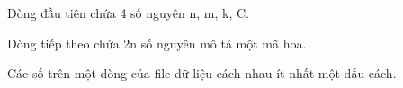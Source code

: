 Dòng đầu tiên chứa 4 số nguyên n, m, k, C.

Dòng tiếp theo chứa 2n số nguyên mô tả một mã hoa.

Các số trên một dòng của file dữ liệu cách nhau ít nhất một dấu cách.